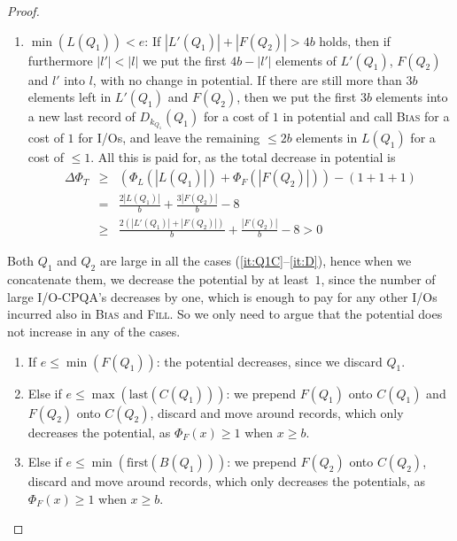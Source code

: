 \documentclass{sig-alternate}
\newcommand{\first}{\text{first}}
\newcommand{\last}{\text{last}}
\renewcommand{\(}{\left(}
\renewcommand{\)}{\right)}
\begin{document}
\begin{proof}
\begin{fullenv}
\begin{enumerate}
  \item $\min(L(Q_1)) < e$: If $|L'(Q_1)| + |F(Q_2)| > 4b$ holds, then if
    furthermore $|l'| < |l|$ we put the first $4b - |l'|$ elements of
    $L'(Q_1)$, $F(Q_2)$ and $l'$ into $l$, with no change in potential. If there
    are still more than $3b$ elements left in $L'(Q_1)$ and $F(Q_2)$, then we
    put the first $3b$ elements into a new last record of $D_{k_{Q_1}}(Q_1)$ for
    a cost of $1$ in potential and call \textsc{Bias} for a cost of $1$ for
    I/Os, and leave the remaining $\leq 2b$ elements in $L(Q_1)$ for a cost of
    $\leq 1$. All this is paid for, as the total decrease in potential is
    \begin{eqnarray*}
      \Delta \Phi_T
       &\geq&
      \( \Phi_L(|L(Q_1)|) + \Phi_F(|F(Q_2)|) \) - ( 1+1+1 ) \\
       &=&
      \frac{2|L(Q_1)|}{b} + \frac{3|F(Q_2)|}{b} - 8 \\
       &\geq&
      \frac{2(|L'(Q_1)| + |F(Q_2)|)}{b} + \frac{|F(Q_2)|}{b} - 8 > 0
    \end{eqnarray*}
\end{enumerate}
Both $Q_1$ and $Q_2$ are large in all the cases (\ref{it:Q1C}--\ref{it:D}),
hence when we concatenate them, we decrease the potential by at least~$1$, since
the number of large I/O-CPQA's decreases by one, which is enough to pay for any
other I/Os incurred also in \textsc{Bias} and \textsc{Fill}. So we only need to
argue that the potential does not increase in any of the cases.
\begin{enumerate}
  \item If $e \leq \min(F(Q_1))$: the potential decreases, since we discard
    $Q_1$.

  \item Else if $e \leq \max(\last(C(Q_1)))$: we prepend $F(Q_1)$ onto $C(Q_1)$
    and $F(Q_2)$ onto $C(Q_2)$, discard and move around records, which only
    decreases the potential, as $\Phi_F(x) \geq 1$ when $x \geq b$.

  \item Else if $e \leq \min(\first(B(Q_1)))$: we prepend $F(Q_2)$ onto
    $C(Q_2)$, discard and move around records, which only decreases the
    potentials, as $\Phi_F(x) \geq 1$ when $x \geq b$.


\end{enumerate}
\end{fullenv}
\end{proof}
\end{document}

